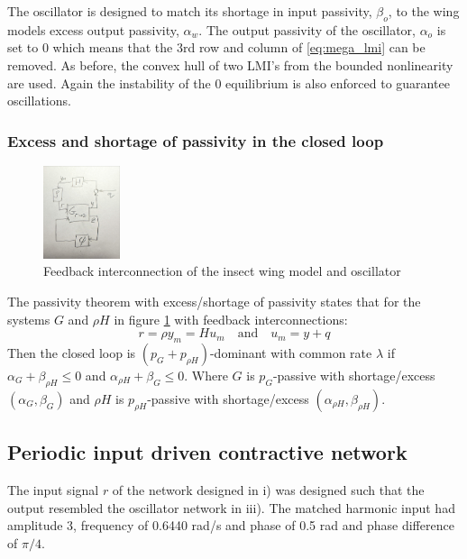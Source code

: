 \documentclass{article}
\begin{document}
The oscillator is designed to match its shortage in input passivity, $\beta_o$, to the wing models excess output passivity, $\alpha_w$.
The output passivity of the oscillator, $\alpha_o$ is set to 0 which means that the 3rd row and column of \ref{eq:mega_lmi} can be removed.
As before, the convex hull of two LMI's from the bounded nonlinearity are used.
Again the instability of the 0 equilibrium is also enforced to guarantee oscillations.

\subsubsection{Excess and shortage of passivity in the closed loop }

\begin{figure}[H]
    \centering
    \includegraphics[width=0.2\textwidth]{figures/excess_shortage.jpg}
    \caption{Feedback interconnection of the insect wing model and oscillator}  
    \label{fig:excess_shortage}
\end{figure}

The passivity theorem with excess/shortage of passivity states that for the systems $G$ and $\rho H$ in figure \ref{fig:excess_shortage} with feedback interconnections:
\begin{equation}
    r = \rho y_m = H u_m \quad \text{and} \quad u_m = y + q
\end{equation}
Then the closed loop is $(p_G + p_{\rho H})$-dominant with common rate $\lambda$ if $\alpha_G + \beta_{\rho H} \leq 0$ and $\alpha_{\rho H} + \beta_G \leq 0$.
Where $G$ is $p_G$-passive with shortage/excess $(\alpha_G, \beta_G)$ and $\rho H$ is $p_{\rho H}$-passive with shortage/excess $(\alpha_{\rho H}, \beta_{\rho H})$.

\subsection{Periodic input driven contractive network}

The input signal $r$ of the network designed in i) was designed such that the output resembled the oscillator network in iii).
The matched harmonic input had amplitude 3, frequency of 0.6440 rad/s and phase of 0.5 rad and phase difference of $\pi/4$.
\end{document}
